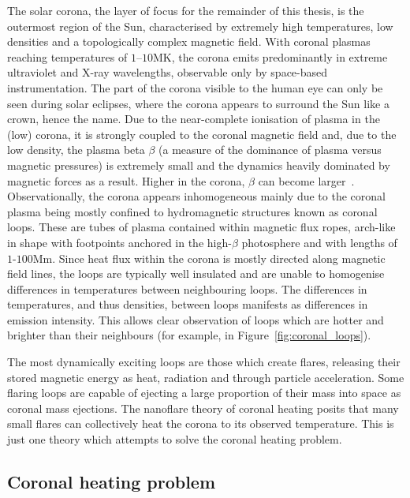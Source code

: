 The solar corona, the layer of focus for the remainder of this thesis, is the outermost region of the Sun, characterised by extremely high temperatures, low densities and a topologically complex magnetic field. With coronal plasmas reaching temperatures of $1$--$10$MK, the corona emits predominantly in extreme ultraviolet and X-ray wavelengths, observable only by space-based instrumentation. The part of the corona visible to the human eye can only be seen during solar eclipses, where the corona appears to surround the Sun like a crown, hence the name. Due to the near-complete ionisation of plasma in the (low) corona, it is strongly coupled to the coronal magnetic field and, due to the low density, the plasma beta $\beta$ (a measure of the dominance of plasma versus magnetic pressures) is extremely small and the dynamics heavily dominated by magnetic forces as a result. Higher in the corona, $\beta$ can become larger~\cite{gomezPlasmaUpbetaEvolution2019}. Observationally, the corona appears inhomogeneous mainly due to the coronal plasma being mostly confined to hydromagnetic structures known as coronal loops. These are tubes of plasma contained within magnetic flux ropes, arch-like in shape with footpoints anchored in the high-$\beta$ photosphere and with lengths of $1$-$100$Mm. Since heat flux within the corona is mostly directed along magnetic field lines, the loops are typically well insulated and are unable to homogenise differences in temperatures between neighbouring loops. The differences in temperatures, and thus densities, between loops manifests as differences in emission intensity. This allows clear observation of loops which are hotter and brighter than their neighbours (for example, in Figure~\ref{fig:coronal_loops}).

The most dynamically exciting loops are those which create flares, releasing their stored magnetic energy as heat, radiation and through particle acceleration. Some flaring loops are capable of ejecting a large proportion of their mass into space as coronal mass ejections. The nanoflare theory of coronal heating posits that many small flares can collectively heat the corona to its observed temperature. This is just one theory which attempts to solve the coronal heating problem.

\subsection{Coronal heating problem}

